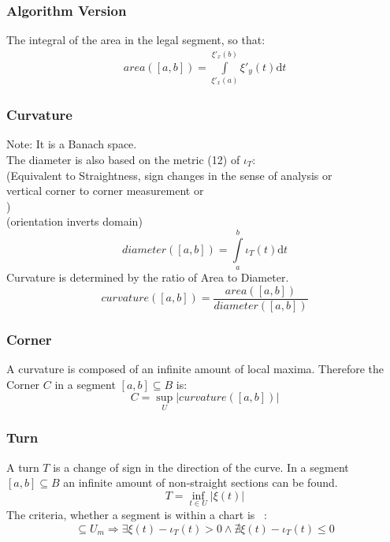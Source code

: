 \documentclass{article}
\newcommand\norm[1]{\left\lVert#1\right\rVert}
\begin{document}
\subsubsection{Algorithm Version}
The integral of the area in the legal segment, so that:
\begin{align}
area([a,b])= \int \limits _{\xi'_{x}(a)}^{\xi'_{x}(b)} \xi'_{y}(t)\mathrm{d}t
\end{align}
\fi

\subsubsection{Curvature}
\iffalse
Because the diameter has to be calculated piece-wise, we have to set up a vector space with the turns $P_{n},P_{n+1} \in T$.
\begin{equation}
v \in (B,\norm{\cdot})
\end{equation}
\fi
Note: It is a Banach space.\\
The diameter is also based on the metric (12) of $\iota_{T}$:\\
(Equivalent to Straightness, sign changes in the sense of analysis or\\
vertical corner to corner measurement or\\
)\\
(orientation inverts domain)
\begin{equation}
diameter([a,b])=\int \limits _{a}^{b} \iota_{T}(t) \mathrm{d}t
\end{equation}
Curvature is determined by the ratio of Area to Diameter.
\begin{equation}
curvature([a,b]) = \frac{area([a,b])}{diameter([a,b])}
\end{equation}

\subsubsection{Corner}
A curvature is composed of an infinite amount of local maxima. Therefore the Corner $C$ in a segment $[a,b] \subseteq B$ is:
\begin{equation}
C = \sup_{U}\lvert curvature([a,b]) \rvert
\end{equation}

\subsubsection{Turn}
A turn $T$ is a change of sign in the direction of the curve. In a segment $[a,b] \subseteq B$ an infinite amount of non-straight sections can be found.
\begin{equation}
T = \inf_{t \in U} \lvert \xi(t) \rvert
\end{equation}
The criteria, whether a segment is within a chart is ~\cite[]{Loring}:
\begin{equation}
[a,b] \subseteq U_{m} \Rightarrow \exists  \xi(t) - \iota_{T}(t) >0 \land \nexists \xi(t) - \iota_{T}(t) \leq0
\end{equation}
\end{document}
